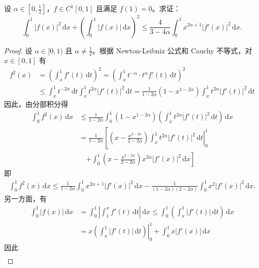 \documentclass[../../main.tex]{subfiles}
\begin{document}
\begin{example}
设 \( \alpha \in \left[0, \frac{1}{2}\right] \)，\( f \in C^1[0,1] \) 且满足 \( f(1) = 0 \)。求证：
\[
\int_{0}^{1} |f(x)|^2 \, \mathrm{d}x + \left( \int_{0}^{1} |f(x)| \, \mathrm{d}x \right)^2 \leqslant \frac{4}{3 - 4\alpha} \int_{0}^{1} x^{2\alpha + 1} |f'(x)|^2 \, \mathrm{d}x.
\]
\end{example}
\begin{proof}
设 \( \alpha \in [0,1) \) 且 \( \alpha \neq \frac{1}{2} \)。根据 Newton-Leibniz 公式和 Cauchy 不等式，对 \( x \in [0,1] \) 有
\begin{align*}
f^2(x) &= \left( \int_{x}^{1} f'(t) \, \mathrm{d}t \right)^2 = \left( \int_{x}^{1} t^{-\alpha} \cdot t^{\alpha} f'(t) \, \mathrm{d}t \right)^2 \\
&\leqslant \int_{x}^{1} t^{-2\alpha} \, \mathrm{d}t \int_{x}^{1} t^{2\alpha} |f'(t)|^2 \, \mathrm{d}t = \frac{1}{1 - 2\alpha} (1 - x^{1 - 2\alpha}) \int_{x}^{1} t^{2\alpha} |f'(t)|^2 \, \mathrm{d}t
\end{align*}
因此，由分部积分得
\begin{align*}
\int_{0}^{1} f^2(x) \, \mathrm{d}x &\leqslant \frac{1}{1 - 2\alpha} \int_{0}^{1} (1 - x^{1 - 2\alpha}) \left( \int_{x}^{1} t^{2\alpha} |f'(t)|^2 \, \mathrm{d}t \right) \, \mathrm{d}x \\
&= \frac{1}{1 - 2\alpha} \left[ \left. \left( x - \frac{x^{2 - 2\alpha}}{2 - 2\alpha} \right) \int_{x}^{1} t^{2\alpha} |f'(t)|^2 \, \mathrm{d}t \right|_{0}^{1} \right. \\
&\quad \left. + \int_{0}^{1} \left( x - \frac{x^{2 - 2\alpha}}{2 - 2\alpha} \right) x^{2\alpha} |f'(x)|^2 \, \mathrm{d}x \right]
\end{align*}
即
\begin{align}
\int_{0}^{1} f^2(x) \, \mathrm{d}x \leqslant \frac{1}{1 - 2\alpha} \int_{0}^{1} x^{2\alpha + 1} |f'(x)|^2 \, \mathrm{d}x - \frac{1}{(1 - 2\alpha)(2 - 2\alpha)} \int_{0}^{1} x^2 |f'(x)|^2 \, \mathrm{d}x .\label{eq:::23523523424jrioj5335}
\end{align}
另一方面，有
\begin{align*}
\int_{0}^{1} |f(x)| \, \mathrm{d}x &= \int_{0}^{1} \left| \int_{1}^{x} f'(t) \, \mathrm{d}t \right| \, \mathrm{d}x \leqslant \int_{0}^{1} \left( \int_{x}^{1} |f'(t)| \, \mathrm{d}t \right) \, \mathrm{d}x \\
&= \left. x \left( \int_{x}^{1} |f'(t)| \, \mathrm{d}t \right) \right|_{0}^{1} + \int_{0}^{1} x |f'(x)| \, \mathrm{d}x
\end{align*}
因此
\begin{align}

\end{align}
\end{proof}
\end{document}
